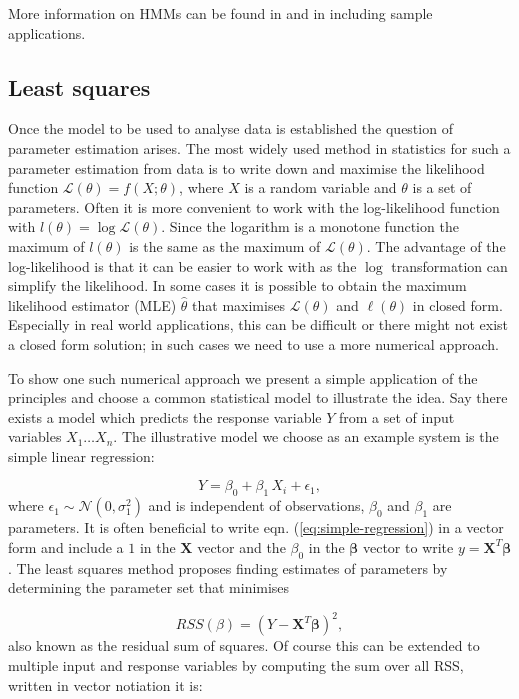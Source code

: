 More information on HMMs can be found in \cite{MacDonald:1997wm} and in \cite{Zucchini:2009vl} including sample applications.


\subsection{Least squares}
\label{sec:least-squares}

Once the model to be used to analyse data is established the question of parameter estimation arises. The most widely used method in statistics for such a parameter estimation from data is  to write down and maximise the likelihood function $ \mathcal{L}(\theta) = f(X; \theta) $, where $X$ is a random variable and $\theta$ is a set of parameters. Often it is more convenient to work with the log-likelihood function with $l(\theta) = \log \mathcal{L}(\theta)$. Since the logarithm is a monotone function the maximum of $l (\theta)$ is the same as the maximum of $\mathcal{L} (\theta)$. The advantage of the log-likelihood is that it can be easier to work with as the $\log$ transformation can simplify the likelihood. In some cases it is possible to obtain the maximum likelihood estimator (MLE) $\hat{\theta}$ that maximises $\mathcal{L}(\theta)$ and $\ell (\theta)$ in closed form. Especially in real world applications, this can be difficult or there might not exist a closed form solution; in such cases we need to use a more numerical approach. 

To show one such numerical approach we present a simple application of the principles and choose a common statistical model to illustrate the idea. Say there exists a model which predicts the response variable $Y$ from a set of input variables $X_1 \ldots X_n$. The illustrative model we choose as an example system is the simple linear regression:

\begin{equation}
  \label{eq:simple-regression}
  Y = \beta_0 + \beta_1 \, X_i + \epsilon_1,
\end{equation}
where $\epsilon_1 \sim \mathcal{N}(0, \sigma_1^2)$ and is independent of observations, $\beta_0$ and $\beta_1$ are parameters. It is often beneficial to write eqn. (\ref{eq:simple-regression}) in a vector form and include a $1$ in the $\mathbf{X}$ vector and the $\beta_0$ in the $\mathbf{\beta}$ vector to write $y = \mathbf{X}^T \mathbf{\beta}$. The least squares method proposes finding estimates of parameters by determining the parameter set that minimises

\begin{equation}
  \label{eq:rss-ls}
  RSS(\beta) = (Y - \mathbf{X}^T \mathbf{\beta})^2, 
\end{equation}
also known as the residual sum of squares. Of course this can be extended to multiple input and response variables by computing the sum over all RSS, written in vector notiation it is:

